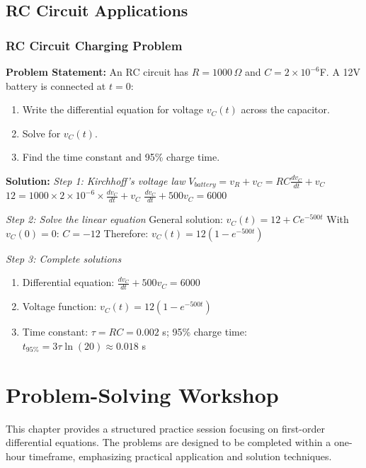 \documentclass[12pt, letterpaper]{book}
\begin{document}
\section{RC Circuit Applications}

\subsection{RC Circuit Charging Problem}
\textbf{Problem Statement:}
An RC circuit has $R = 1000\,\Omega$ and $C = 2 \times 10^{-6}$F. A 12V battery is connected at $t = 0$:
\begin{enumerate}
    \item Write the differential equation for voltage $v_C(t)$ across the capacitor.
    \item Solve for $v_C(t)$.
    \item Find the time constant and 95\% charge time.
\end{enumerate}

\textbf{Solution:}
\textit{Step 1: Kirchhoff's voltage law}
$V_{battery} = v_R + v_C = RC\frac{dv_C}{dt} + v_C$
$12 = 1000 \times 2 \times 10^{-6} \times \frac{dv_C}{dt} + v_C$
$\frac{dv_C}{dt} + 500v_C = 6000$

\textit{Step 2: Solve the linear equation}
General solution: $v_C(t) = 12 + Ce^{-500t}$
With $v_C(0) = 0$: $C = -12$
Therefore: $v_C(t) = 12(1 - e^{-500t})$

\textit{Step 3: Complete solutions}
\begin{enumerate}
    \item Differential equation: $\frac{dv_C}{dt} + 500v_C = 6000$
    \item Voltage function: $v_C(t) = 12(1 - e^{-500t})$
    \item Time constant: $\tau = RC = 0.002$ s; 95\% charge time: $t_{95\%} = 3\tau \ln(20) \approx 0.018$ s
\end{enumerate}

\chapter{Problem-Solving Workshop}
\label{chap:session_4}

This chapter provides a structured practice session focusing on first-order differential equations. The problems are designed to be completed within a one-hour timeframe, emphasizing practical application and solution techniques.
\end{document}
